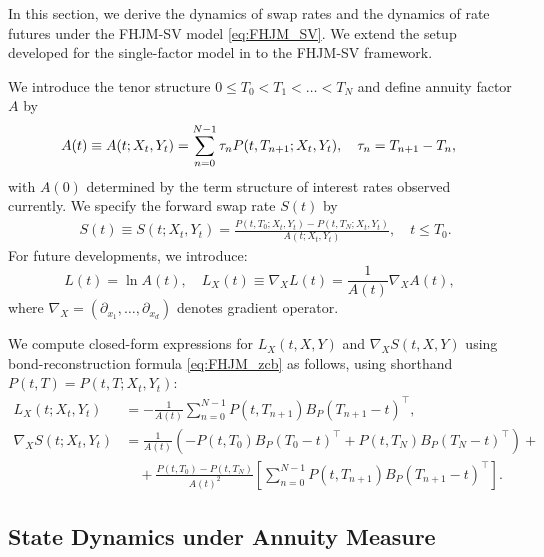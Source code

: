\documentclass[pdftex,11pt,a4paper] {article}
\begin{document}
In this section, we derive the dynamics of swap rates and the dynamics of rate futures under the FHJM-SV model \eqref{eq:FHJM_SV}. We extend the setup developed for the single-factor model in \cite{SeppRakhmonov2023a} to the FHJM-SV framework.

We introduce the tenor structure $0\le T_0<T_1<\ldots<T_N$ and define annuity factor $A$ by
\begin{equation}\label{eq:annuity}
A(t)\equiv A(t; X_t, Y_t)  =\sum_{n=0}^{N-1}\tau_n P(t,T_{n+1}; X_t, Y_t),\quad \tau_n=T_{n+1}-T_n,\\
\end{equation}
with $A(0)$ determined by the term structure of interest rates observed currently. We specify the forward swap rate $S(t)$ by
\begin{equation}\label{eq:swap_rate}
\begin{split}
& S(t) \equiv S(t; X_t, Y_t) = \frac{P(t,T_0; X_t, Y_t)-P(t,T_N; X_t, Y_t)}{A(t; X_t, Y_t)},\quad t\le T_0.
\end{split}
\end{equation}
For future developments, we introduce:
\begin{equation}\label{eq:log_annuity}
L(t)=\ln A(t),\quad L_X(t) \equiv \nabla_X L(t)=\frac{1}{A(t)}\nabla_X A(t),
\end{equation}
where $\nabla_X=\left(\partial_{x_1},\ldots,\partial_{x_d}\right)$ denotes gradient operator.

We compute closed-form expressions for $L_X(t,X,Y)$ and $\nabla_X S(t,X,Y)$ using bond-reconstruction formula \eqref{eq:FHJM_zcb} as follows, using shorthand $P(t,T)=P(t,T; X_t, Y_t)$:
\begin{equation}\label{eq:nambla_x}
\begin{split}
L_X(t; X_{t},Y_{t})& = -\frac{1}{A(t)}\sum_{n=0}^{N-1}P(t,T_{n+1})B_P(T_{n+1}-t)^\top,\\
\nabla_X S(t;X_{t},Y_{t})&=\frac{1}{A(t)}\left(-P(t,T_0)B_P(T_{0}-t)^\top+P(t,T_N)B_P(T_{N}-t)^\top\right)+\\
&\quad +\frac{P(t,T_0)-P(t,T_N)}{A(t)^2}\left[\sum_{n=0}^{N-1}P(t,T_{n+1})B_P(T_{n+1}-t)^\top\right].
\end{split}
\end{equation}


\subsection{State Dynamics under Annuity Measure}
\end{document}
